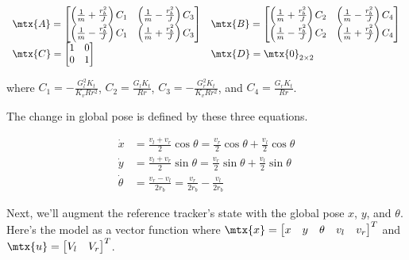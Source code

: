 \begin{equation}
  \begin{array}{ll}
    \mtx{A} =
    \begin{bmatrix}
      \left(\frac{1}{m} + \frac{r_b^2}{J}\right) C_1 &
        \left(\frac{1}{m} - \frac{r_b^2}{J}\right) C_3 \\
      \left(\frac{1}{m} - \frac{r_b^2}{J}\right) C_1 &
        \left(\frac{1}{m} + \frac{r_b^2}{J}\right) C_3
    \end{bmatrix} &
    \mtx{B} =
    \begin{bmatrix}
      \left(\frac{1}{m} + \frac{r_b^2}{J}\right) C_2 &
        \left(\frac{1}{m} - \frac{r_b^2}{J}\right) C_4 \\
      \left(\frac{1}{m} - \frac{r_b^2}{J}\right) C_2 &
        \left(\frac{1}{m} + \frac{r_b^2}{J}\right) C_4
    \end{bmatrix} \\
    \mtx{C} =
    \begin{bmatrix}
      1 & 0 \\
      0 & 1 \\
    \end{bmatrix} &
    \mtx{D} = \mtx{0}_{2 \times 2}
  \end{array}
\end{equation}

where $C_1 = -\frac{G_l^2 K_t}{K_v R r^2}$, $C_2 = \frac{G_l K_t}{Rr}$,
$C_3 = -\frac{G_r^2 K_t}{K_v R r^2}$, and $C_4 = \frac{G_r K_t}{Rr}$.

The change in global pose is defined by these three equations.

\begin{align*}
  \dot{x} &= \frac{v_l + v_r}{2}\cos\theta = \frac{v_r}{2}\cos\theta +
    \frac{v_l}{2}\cos\theta \\
  \dot{y} &= \frac{v_l + v_r}{2}\sin\theta = \frac{v_r}{2}\sin\theta +
    \frac{v_l}{2}\sin\theta \\
  \dot{\theta} &= \frac{v_r - v_l}{2r_b} = \frac{v_r}{2r_b} - \frac{v_l}{2r_b}
\end{align*}

Next, we'll augment the reference tracker's state with the global pose $x$, $y$,
and $\theta$. Here's the model as a vector function where
$\mtx{x} = \begin{bmatrix} x & y & \theta & v_l & v_r \end{bmatrix}^T$ and
$\mtx{u} = \begin{bmatrix} V_l & V_r \end{bmatrix}^T$.

